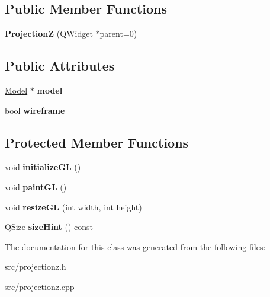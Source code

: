 \subsection*{Public Member Functions}
\begin{DoxyCompactItemize}
\item 
\mbox{\label{class_projection_z_ac812d46606329365a4e877b6cc58d86d}} 
{\bfseries ProjectionZ} (Q\+Widget $\ast$parent=0)
\end{DoxyCompactItemize}
\subsection*{Public Attributes}
\begin{DoxyCompactItemize}
\item 
\mbox{\label{class_projection_z_a72def73a612bcd05243ae8acad447908}} 
\mbox{\hyperlink{class_model}{Model}} $\ast$ {\bfseries model}
\item 
\mbox{\label{class_projection_z_a24466982ce2e792bb843426c35782222}} 
bool {\bfseries wireframe}
\end{DoxyCompactItemize}
\subsection*{Protected Member Functions}
\begin{DoxyCompactItemize}
\item 
\mbox{\label{class_projection_z_aa470131d521e6595d293e12f0fa3425f}} 
void {\bfseries initialize\+GL} ()
\item 
\mbox{\label{class_projection_z_a192e7a4a75e41e9d2c411eb252c2d2d6}} 
void {\bfseries paint\+GL} ()
\item 
\mbox{\label{class_projection_z_a5f276e00f3680aa3ec663030e74df160}} 
void {\bfseries resize\+GL} (int width, int height)
\item 
\mbox{\label{class_projection_z_a5baf9e15d828cff9501fd94fa622b32b}} 
Q\+Size {\bfseries size\+Hint} () const
\end{DoxyCompactItemize}


The documentation for this class was generated from the following files\+:\begin{DoxyCompactItemize}
\item 
src/projectionz.\+h\item 
src/projectionz.\+cpp\end{DoxyCompactItemize}
